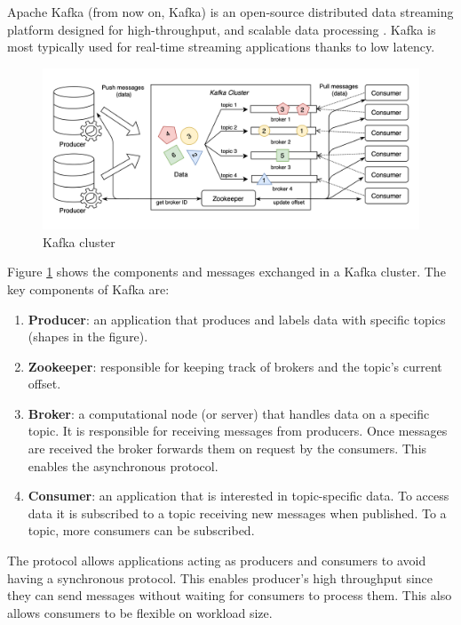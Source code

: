 Apache Kafka (from now on, Kafka) is an open-source distributed data streaming platform designed for high-throughput, and scalable data processing \cite{krepsKafkaDistributedMessaging2011}. Kafka is most typically used for real-time streaming applications thanks to low latency. 

\begin{figure}[!ht]
    \begin{center}
      \includegraphics[width=\textwidth]{figures/2-background/kafka.png}
    \end{center}
    \caption{Kafka cluster}
    \label{fig:kafka}
\end{figure}

Figure \ref{fig:kafka} shows the components and messages exchanged in a Kafka cluster. The key components of Kafka are:
\begin{enumerate}
    \item \textbf{Producer}: an application that produces and labels data with specific topics (shapes in the figure).
    \item \textbf{Zookeeper}: responsible for keeping track of brokers and the topic's current offset.
    \item \textbf{Broker}: a computational node (or server) that handles data on a specific topic. It is responsible for receiving messages from producers. Once messages are received the broker forwards them on request by the consumers. This enables the asynchronous protocol.
    \item \textbf{Consumer}: an application that is interested in topic-specific data. To access data it is subscribed to a topic receiving new messages when published. To a topic, more consumers can be subscribed.
\end{enumerate}

The protocol allows applications acting as producers and consumers to avoid having a synchronous protocol. This enables producer's high throughput since they can send messages without waiting for consumers to process them. This also allows consumers to be flexible on workload size.


